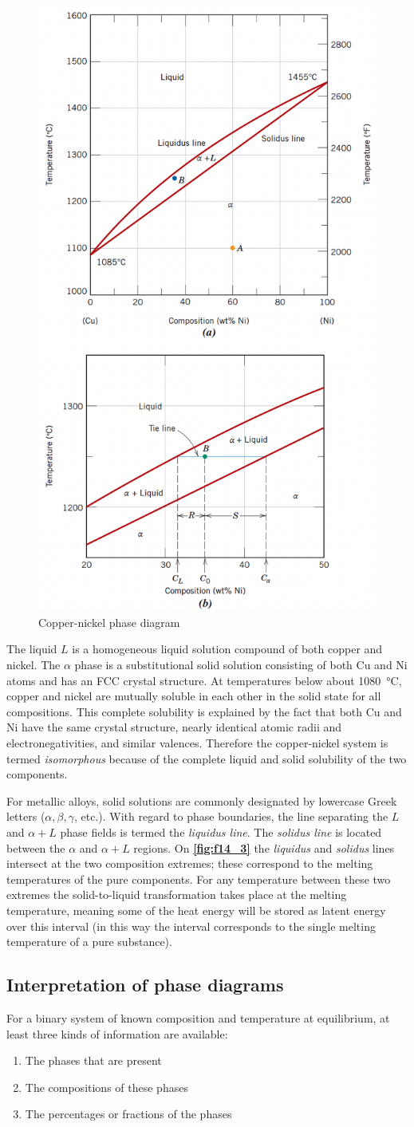\begin{figure} [ht]
  \centering
  \includegraphics[width=0.25\linewidth]{./figures/f14_3.png}
  \caption{Copper-nickel phase diagram}
  \label{fig:f14_3}
\end{figure}

The liquid $L$ is a homogeneous liquid solution compound of both copper and nickel. The $\alpha$ phase is a substitutional solid solution consisting of both Cu and Ni atoms and has an FCC crystal structure. At temperatures below about \qty{1080}{\celsius}, copper and nickel are mutually soluble in each other in the solid state for all compositions. This complete solubility is explained by the fact that both Cu and Ni have the same crystal structure, nearly identical atomic radii and electronegativities, and similar valences. Therefore the copper-nickel system is termed \textit{isomorphous} because of the complete liquid and solid solubility of the two components.

For metallic alloys, solid solutions are commonly designated by lowercase Greek letters ($\alpha, \beta, \gamma$, etc.). With regard to phase boundaries, the line separating the $L$ and $\alpha + L$ phase fields is termed the \textit{liquidus line}. The \textit{solidus line} is located between the $\alpha$ and $\alpha + L$ regions. On \textbf{\autoref{fig:f14_3}} the \textit{liquidus} and \textit{solidus} lines intersect at the two composition extremes; these correspond to the melting temperatures of the pure components. For any temperature between these two extremes the solid-to-liquid transformation takes place at the melting temperature, meaning some of the heat energy will be stored as latent energy over this interval (in this way the interval corresponds to the single melting temperature of a pure substance).

\subsection{Interpretation of phase diagrams}
For a binary system of known composition and temperature at equilibrium, at least three kinds of information are available:
\begin{enumerate}
  \item The phases that are present
  \item The compositions of these phases
  \item The percentages or fractions of the phases
\end{enumerate}


